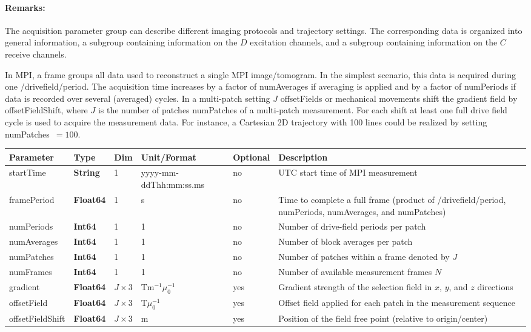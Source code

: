 \documentclass[landscape,a4paper]{article} %
\newcommand{\inltab}[1]{{\ttfamily\bfseries\color{blue}#1}}
\newcommand{\inlvar}[1]{{\ttfamily#1}}
\begin{document}
\begin{multicols}{2}
\paragraph{Remarks:} The acquisition parameter group can describe different imaging protocols and trajectory settings. The corresponding data is organized into general information, a subgroup containing information on the $D$ excitation channels, and a subgroup containing information on the $C$ receive channels.

In MPI, a frame groups all data used to reconstruct a single MPI image/tomogram. In the simplest scenario, this data is acquired during one \inlvar{/drivefield/period}. The acquisition time increases by a factor of \inlvar{numAverages} if averaging is applied and by a factor of \inlvar{numPeriods} if data is recorded over several (averaged) cycles. In a multi-patch setting $J$ \inlvar{offsetField}s or mechanical movements shift the gradient field by \inlvar{offsetFieldShift}, where $J$ is the number of patches \inlvar{numPatches} of a multi-patch measurement. For each shift at least one full drive field cycle is used to acquire the measurement data. For instance, a Cartesian 2D trajectory with 100 lines could be realized by setting \mbox{\inlvar{numPatches} $ = 100$}.

\end{multicols}

\noindent \begin{tabularx}{\columnwidth}{lllllX}
\textbf{Parameter} & \textbf{Type} & \textbf{Dim} & \textbf{Unit/Format} & \textbf{Optional} & \textbf{Description} \\ \hline
\inlvar{startTime} & \inltab{String} & 1 & yyyy-mm-ddThh:mm:ss.ms & no & UTC start time of MPI measurement \\ \hline
\inlvar{framePeriod} & \inltab{Float64} & 1 & s & no & Time to complete a full frame (product of \inlvar{/drivefield/period}, \inlvar{numPeriods}, \inlvar{numAverages}, and \inlvar{numPatches}) \\ \hline
\inlvar{numPeriods} & \inltab{Int64} & 1 & 1 & no & Number of drive-field periods per patch \\ \hline
\inlvar{numAverages} & \inltab{Int64} & 1 & 1& no & Number of block averages per patch\\ \hline
\inlvar{numPatches} & \inltab{Int64} & 1 & 1 & no & Number of patches within a frame denoted by $J$ \\ \hline
\inlvar{numFrames} & \inltab{Int64} & 1 & 1& no & Number of available measurement frames $N$ \\ \hline
\inlvar{gradient} & \inltab{Float64} & $J \times 3$ & Tm$^{-1}\mu_0^{-1}$ & yes & Gradient strength of the selection field in $x$, $y$, and $z$ directions \\ \hline
\inlvar{offsetField} & \inltab{Float64} & $J \times 3$ & T$\mu_0^{-1}$ & yes & Offset field applied for each patch in the measurement sequence \\ \hline
\inlvar{offsetFieldShift} & \inltab{Float64} & $J \times 3$ & m & yes & Position of the field free point (relative to origin/center) \\ \hline
\end{tabularx}
\end{document}
